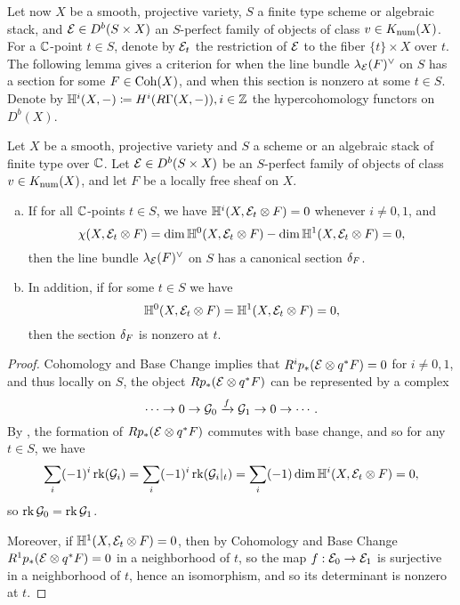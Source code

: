 Let now $X$ be a smooth, projective variety, $S$ a finite type scheme or algebraic stack, and $\mathcal{E} \in D^b(S \times X)$ an $S$-perfect family of objects of class $v \in K_{\mathrm{num}}(X)$. For a $\mathbb{C}$-point $t \in S$, denote by $\mathcal{E}_t$ the restriction of $\mathcal{E}$ to the fiber $\{t\} \times X$ over $t$. The following lemma gives a criterion for when the line bundle $\lambda_{\mathcal{E}}(F)^\vee$ on $S$ has a section for some $F \in \operatorname{\mathrm{Coh}}(X)$, and when this section is nonzero at some $t \in S$. Denote by $\mathbb{H}^i(X, -) \coloneqq H^i(R\Gamma(X, -)), i \in \mathbb{Z}$ the hypercohomology functors on $D^b(X)$.
\begin{lem}\label{detsection}
    Let $X$ be a smooth, projective variety and $S$ a scheme or an algebraic stack of finite type over $\mathbb{C}$. Let $\mathcal{E} \in D^b(S \times X)$ be an $S$-perfect family of objects of class $v \in K_{\mathrm{num}}(X)$, and let $F$ be a locally free sheaf on $X$.
    \begin{enumerate}[(a)]
        \item If for all $\mathbb{C}$-points $t \in S$, we have $\mathbb{H}^i(X, \mathcal{E}_t \otimes F) = 0$ whenever $i \neq 0, 1$, and 
        \[ \chi(X, \mathcal{E}_t \otimes F) = \dim \mathbb{H}^0(X, \mathcal{E}_t \otimes F) - \dim \mathbb{H}^1(X, \mathcal{E}_t \otimes F) = 0, \]
        then the line bundle $\lambda_{\mathcal{E}}(F)^\vee$ on $S$ has a canonical section $\delta_F$.
        \item In addition, if for some $t \in S$ we have 
        \[ \mathbb{H}^0(X, \mathcal{E}_t \otimes F) = \mathbb{H}^1(X, \mathcal{E}_t \otimes F) = 0, \]
        then the section $\delta_F$ is nonzero at $t$.
    \end{enumerate}
\end{lem}
\begin{proof}
    Cohomology and Base Change implies that $R^i p_*(\mathcal{E} \otimes q^* F) = 0$ for $i \neq 0,1$, and thus locally on $S$, the object $R p_*(\mathcal{E} \otimes q^*F)$ can be represented by a complex
    \[ \cdots \to 0 \to \mathcal{G}_0 \xrightarrow{f} \mathcal{G}_1 \to 0 \to \cdots. \]
    By \cite[\href{https://stacks.math.columbia.edu/tag/0B91}{Tag 0B91}]{stacks-project}, the formation of $R p_*(\mathcal{E} \otimes q^*F)$ commutes with base change, and so for any $t \in S$, we have 
    \[ \sum_i (-1)^i \operatorname{\mathrm{rk}}(\mathcal{G}_i) = \sum_i (-1)^i \operatorname{\mathrm{rk}}(\mathcal{G}_i|_t) = \sum_i (-1) \dim \mathbb{H}^i(X, \mathcal{E}_t \otimes F) = 0, \]
    so $\operatorname{\mathrm{rk}} \mathcal{G}_0 = \operatorname{\mathrm{rk}} \mathcal{G}_1$.
    
    Moreover, if $\mathbb{H}^1(X, \mathcal{E}_t \otimes F) = 0$, then by Cohomology and Base Change $R^1 p_*(\mathcal{E} \otimes q^*F) = 0$ in a neighborhood of $t$, so the map $f: \mathcal{E}_0 \to \mathcal{E}_1$ is surjective in a neighborhood of $t$, hence an isomorphism, and so its determinant is nonzero at $t$.
\end{proof}

